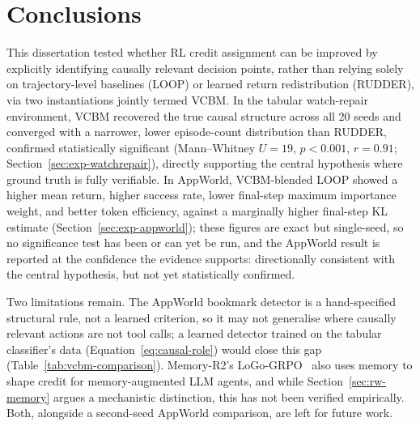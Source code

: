 
\section{Conclusions}
\label{sec:conclusions}

This dissertation tested whether RL credit assignment can be improved by explicitly identifying causally relevant decision points, rather than relying solely on trajectory-level baselines (LOOP) or learned return redistribution (RUDDER), via two instantiations jointly termed VCBM. In the tabular watch-repair environment, VCBM recovered the true causal structure across all 20 seeds and converged with a narrower, lower episode-count distribution than RUDDER, confirmed statistically significant (Mann--Whitney $U=19$, $p<0.001$, $r=0.91$; Section~\ref{sec:exp-watchrepair}), directly supporting the central hypothesis where ground truth is fully verifiable. In AppWorld, VCBM-blended LOOP showed a higher mean return, higher success rate, lower final-step maximum importance weight, and better token efficiency, against a marginally higher final-step KL estimate (Section~\ref{sec:exp-appworld}); these figures are exact but single-seed, so no significance test has been or can yet be run, and the AppWorld result is reported at the confidence the evidence supports: directionally consistent with the central hypothesis, but not yet statistically confirmed.

Two limitations remain. The AppWorld bookmark detector is a hand-specified structural rule, not a learned criterion, so it may not generalise where causally relevant actions are not tool calls; a learned detector trained on the tabular classifier's data (Equation~\ref{eq:causal-role}) would close this gap (Table~\ref{tab:vcbm-comparison}). Memory-R2's LoGo-GRPO~\cite{memoryr22026} also uses memory to shape credit for memory-augmented LLM agents, and while Section~\ref{sec:rw-memory} argues a mechanistic distinction, this has not been verified empirically. Both, alongside a second-seed AppWorld comparison, are left for future work.

\clearpage %
\printbibliography[title={References},heading=bibintoc] %

